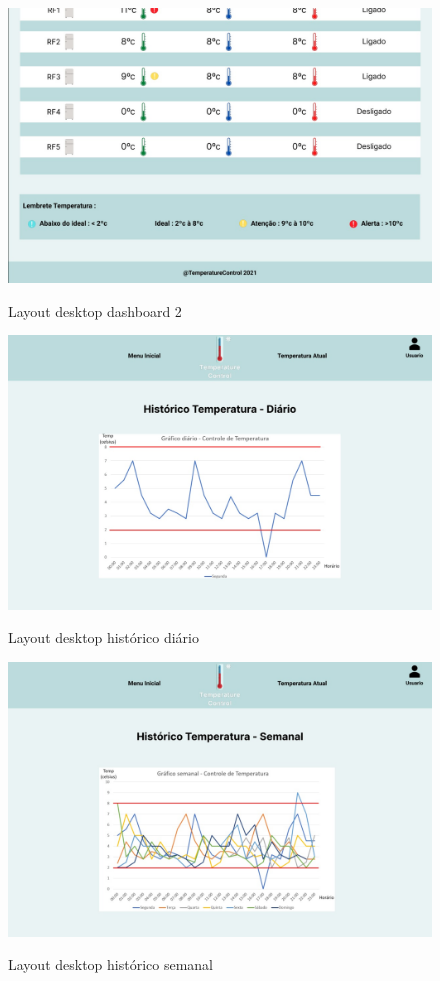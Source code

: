     \begin{figure}[ht]
        \caption{Layout desktop dashboard 2}
        \centering
        \includegraphics[scale=0.35]{img/desktop/dashboard_2.jpeg}
        \label{fig:desktopDashboard2}
    \end{figure}

    \begin{figure}[ht]
        \caption{Layout desktop histórico diário}
        \centering
        \includegraphics[scale=0.35]{img/desktop/temp_diaria.jpeg}
        \label{fig:desktopTempDiaria}
    \end{figure}

    \begin{figure}[ht]
        \caption{Layout desktop histórico semanal}
        \centering
        \includegraphics[scale=0.35]{img/desktop/temp_semanal.jpeg}
        \label{fig:desktopTempSemanal}
    \end{figure}
